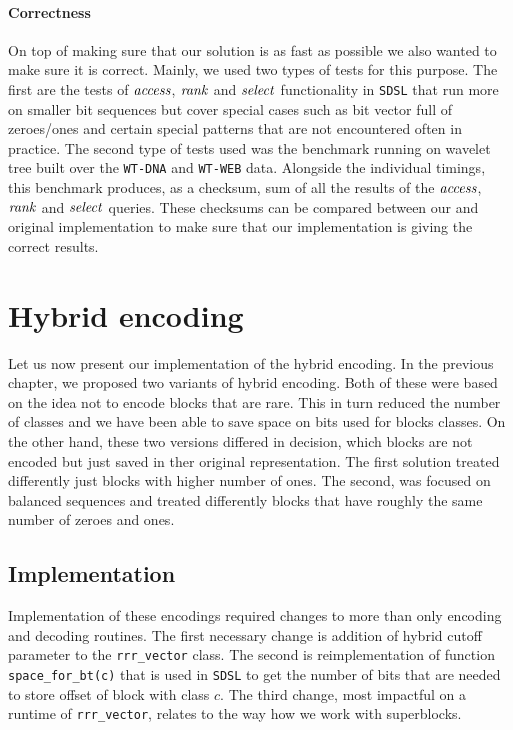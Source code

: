 \paragraph{Correctness}

On top of making sure that our solution is as fast as possible we also wanted to make sure it is
correct. Mainly, we used two types of tests for this purpose. The first are the tests of $\mathit{access}$,
$\mathit{rank}$ and $\mathit{select}$ functionality in \texttt{SDSL} that run more on smaller bit sequences
but cover special cases such as bit vector full of zeroes/ones and certain special patterns
that are not encountered often in practice. The second type of tests used was the benchmark
running on wavelet tree built over the \texttt{WT-DNA} and \texttt{WT-WEB} data. Alongside
the individual timings, this benchmark produces, as a checksum, sum of all the results of the
$\mathit{access}$, $\mathit{rank}$ and $\mathit{select}$ queries. These checksums can be compared between our and original
implementation to make sure that our implementation is giving the correct results.

\section{Hybrid encoding}

Let us now present our implementation of the hybrid encoding. In the previous chapter, we
proposed two variants of hybrid encoding. Both of these were based on the idea not to
encode blocks that are rare. This in turn reduced the number of classes and we 
have been able to save space on bits used for blocks classes. On the other hand, these
two versions differed in decision, which blocks are not encoded but just saved in ther original
representation. The first solution treated differently just blocks with higher number of ones.
The second, was focused on balanced sequences and treated differently blocks that have roughly
the same number of zeroes and ones.

\subsection{Implementation}

Implementation of these encodings required changes to more than only encoding and decoding
routines. The first necessary change is addition of hybrid cutoff parameter
to the \texttt{rrr\_vector} class. The second is reimplementation of function
\texttt{space\_for\_bt(c)} that is used in \texttt{SDSL} to get the number of bits that are
needed to store offset of block with class $c$. The third change, most impactful on a runtime
of \texttt{rrr\_vector}, relates to the way how we work with superblocks.


